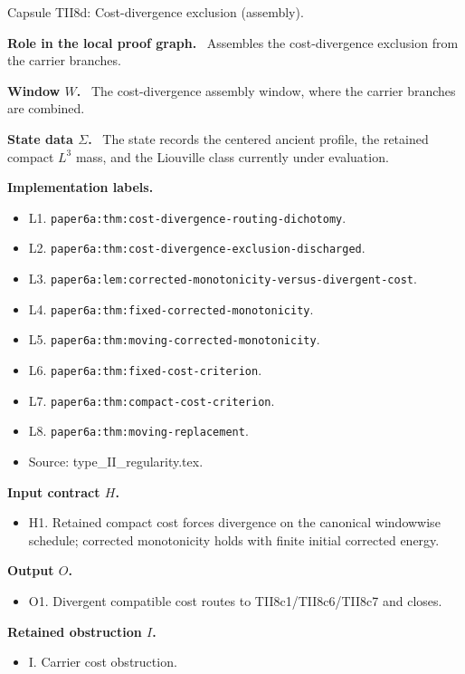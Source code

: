 \documentclass[11pt]{amsart}
\newcommand{\capsulefield}[1]{\par\smallskip\noindent\textbf{#1.}\ }
\begin{document}
\begin{proofcapsule}{Capsule TII8d: Cost-divergence exclusion (assembly).}
  \capsulefield{Role in the local proof graph}
  Assembles the cost-divergence exclusion from the carrier branches.

  \capsulefield{Window \(W\)}
The cost-divergence assembly window, where the carrier branches are combined.

  \capsulefield{State data \(\Sigma\)}
The state records the centered ancient profile, the retained compact $L^3$ mass, and the Liouville class currently under evaluation.

  \capsulefield{Implementation labels}
  \begin{itemize}[leftmargin=1.8em]
  \item L1. \texttt{paper6a:thm:cost-divergence-routing-dichotomy}.
  \item L2. \texttt{paper6a:thm:cost-divergence-exclusion-discharged}.
  \item L3. \texttt{paper6a:lem:corrected-monotonicity-versus-divergent-cost}.
  \item L4. \texttt{paper6a:thm:fixed-corrected-monotonicity}.
  \item L5. \texttt{paper6a:thm:moving-corrected-monotonicity}.
  \item L6. \texttt{paper6a:thm:fixed-cost-criterion}.
  \item L7. \texttt{paper6a:thm:compact-cost-criterion}.
  \item L8. \texttt{paper6a:thm:moving-replacement}.
  \item Source: type\_II\_regularity.tex.
  \end{itemize}

  \capsulefield{Input contract \(H\)}
  \begin{itemize}[leftmargin=1.8em]
  \item H1. Retained compact cost forces divergence on the canonical windowwise schedule; corrected monotonicity holds with finite initial corrected energy.
  \end{itemize}

  \capsulefield{Output \(O\)}
  \begin{itemize}[leftmargin=1.8em]
  \item O1. Divergent compatible cost routes to TII8c1/TII8c6/TII8c7 and closes.
  \end{itemize}

  \capsulefield{Retained obstruction \(I\)}
  \begin{itemize}[leftmargin=1.8em]
  \item I. Carrier cost obstruction.
  \end{itemize}


\end{proofcapsule}
\end{document}
